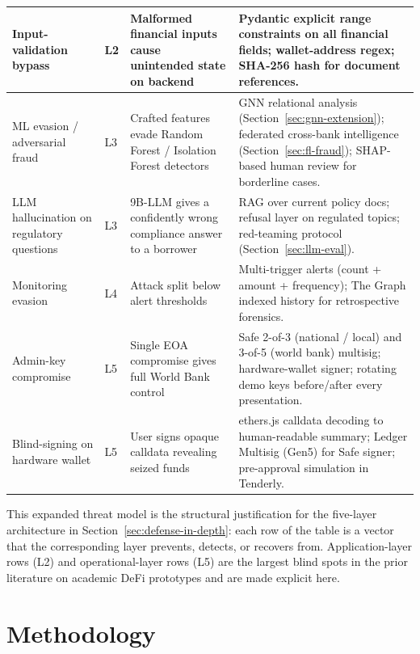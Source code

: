 \documentclass[12pt,a4paper]{report}
\begin{document}
\begin{table}[H]
\begin{tabular}{p{2.6cm}p{2.0cm}p{4.5cm}p{4.8cm}}
\hline
Input-validation bypass & L2 & Malformed financial inputs cause unintended state on backend & Pydantic explicit range constraints on all financial fields; wallet-address regex; SHA-256 hash for document references. \\
\hline
ML evasion / adversarial fraud & L3 & Crafted features evade Random Forest / Isolation Forest detectors & GNN relational analysis (Section~\ref{sec:gnn-extension}); federated cross-bank intelligence (Section~\ref{sec:fl-fraud}); SHAP-based human review for borderline cases. \\
\hline
LLM hallucination on regulatory questions & L3 & 9B-LLM gives a confidently wrong compliance answer to a borrower & RAG over current policy docs; refusal layer on regulated topics; red-teaming protocol (Section~\ref{sec:llm-eval}). \\
\hline
Monitoring evasion & L4 & Attack split below alert thresholds & Multi-trigger alerts (count + amount + frequency); The Graph indexed history for retrospective forensics. \\
\hline
Admin-key compromise & L5 & Single EOA compromise gives full World Bank control & Safe 2-of-3 (national / local) and 3-of-5 (world bank) multisig; hardware-wallet signer; rotating demo keys before/after every presentation. \\
\hline
Blind-signing on hardware wallet & L5 & User signs opaque calldata revealing seized funds & ethers.js calldata decoding to human-readable summary; Ledger Multisig (Gen5) for Safe signer; pre-approval simulation in Tenderly. \\
\hline
\end{tabular}
\end{table}

This expanded threat model is the structural justification for the five-layer architecture in Section~\ref{sec:defense-in-depth}: each row of the table is a vector that the corresponding layer prevents, detects, or recovers from. Application-layer rows (L2) and operational-layer rows (L5) are the largest blind spots in the prior literature on academic DeFi prototypes and are made explicit here.


\chapter{Methodology}
\end{document}
